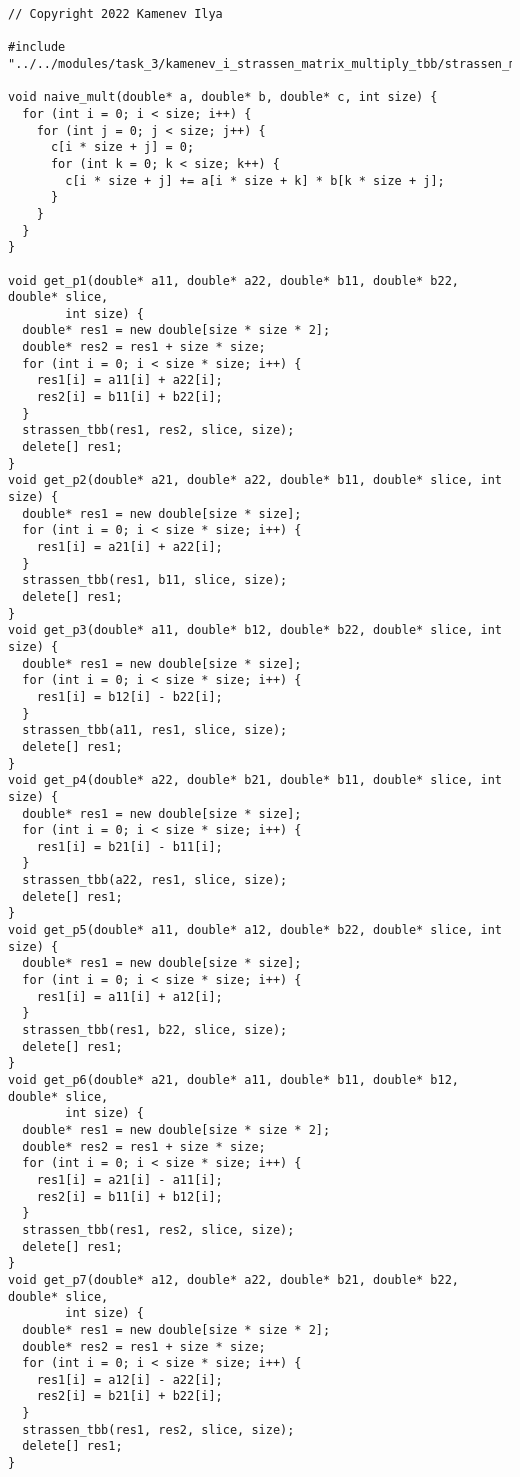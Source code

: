 \documentclass{report}
\begin{document}
\begin{lstlisting}
// Copyright 2022 Kamenev Ilya

#include "../../modules/task_3/kamenev_i_strassen_matrix_multiply_tbb/strassen_matrix_multiply_tbb.h"

void naive_mult(double* a, double* b, double* c, int size) {
  for (int i = 0; i < size; i++) {
    for (int j = 0; j < size; j++) {
      c[i * size + j] = 0;
      for (int k = 0; k < size; k++) {
        c[i * size + j] += a[i * size + k] * b[k * size + j];
      }
    }
  }
}

void get_p1(double* a11, double* a22, double* b11, double* b22, double* slice,
        int size) {
  double* res1 = new double[size * size * 2];
  double* res2 = res1 + size * size;
  for (int i = 0; i < size * size; i++) {
    res1[i] = a11[i] + a22[i];
    res2[i] = b11[i] + b22[i];
  }
  strassen_tbb(res1, res2, slice, size);
  delete[] res1;
}
void get_p2(double* a21, double* a22, double* b11, double* slice, int size) {
  double* res1 = new double[size * size];
  for (int i = 0; i < size * size; i++) {
    res1[i] = a21[i] + a22[i];
  }
  strassen_tbb(res1, b11, slice, size);
  delete[] res1;
}
void get_p3(double* a11, double* b12, double* b22, double* slice, int size) {
  double* res1 = new double[size * size];
  for (int i = 0; i < size * size; i++) {
    res1[i] = b12[i] - b22[i];
  }
  strassen_tbb(a11, res1, slice, size);
  delete[] res1;
}
void get_p4(double* a22, double* b21, double* b11, double* slice, int size) {
  double* res1 = new double[size * size];
  for (int i = 0; i < size * size; i++) {
    res1[i] = b21[i] - b11[i];
  }
  strassen_tbb(a22, res1, slice, size);
  delete[] res1;
}
void get_p5(double* a11, double* a12, double* b22, double* slice, int size) {
  double* res1 = new double[size * size];
  for (int i = 0; i < size * size; i++) {
    res1[i] = a11[i] + a12[i];
  }
  strassen_tbb(res1, b22, slice, size);
  delete[] res1;
}
void get_p6(double* a21, double* a11, double* b11, double* b12, double* slice,
        int size) {
  double* res1 = new double[size * size * 2];
  double* res2 = res1 + size * size;
  for (int i = 0; i < size * size; i++) {
    res1[i] = a21[i] - a11[i];
    res2[i] = b11[i] + b12[i];
  }
  strassen_tbb(res1, res2, slice, size);
  delete[] res1;
}
void get_p7(double* a12, double* a22, double* b21, double* b22, double* slice,
        int size) {
  double* res1 = new double[size * size * 2];
  double* res2 = res1 + size * size;
  for (int i = 0; i < size * size; i++) {
    res1[i] = a12[i] - a22[i];
    res2[i] = b21[i] + b22[i];
  }
  strassen_tbb(res1, res2, slice, size);
  delete[] res1;
}


\end{lstlisting}
\end{document}
